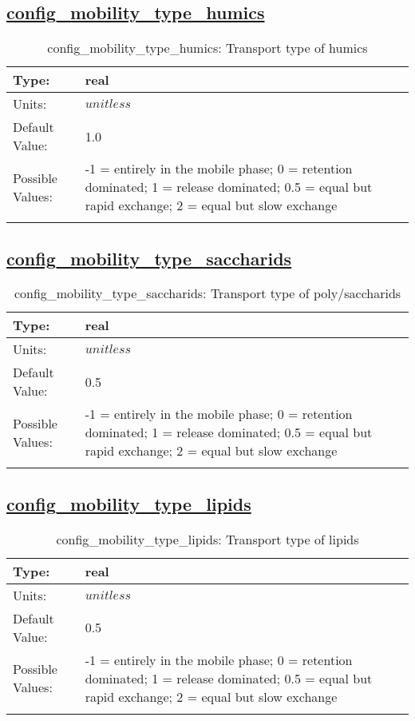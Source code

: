 \subsection[config\_mobility\_type\_humics]{\hyperref[sec:nm_tab_biogeochemistry]{config\_mobility\_type\_humics}}
\label{subsec:nm_sec_config_mobility_type_humics}
\begin{center}
\begin{longtable}{| p{2.0in} || p{4.0in} |}
    \hline
    Type: & real \\
    \hline
    Units: & $unitless$ \\
    \hline
    Default Value: & 1.0 \\
    \hline
    Possible Values: & -1 = entirely in the mobile phase; 0 = retention dominated;     1 = release dominated; 0.5 = equal but rapid exchange;     2 = equal but slow exchange \\
    \hline
    \caption{config\_mobility\_type\_humics: Transport type of humics}
\end{longtable}
\end{center}
\subsection[config\_mobility\_type\_saccharids]{\hyperref[sec:nm_tab_biogeochemistry]{config\_mobility\_type\_saccharids}}
\label{subsec:nm_sec_config_mobility_type_saccharids}
\begin{center}
\begin{longtable}{| p{2.0in} || p{4.0in} |}
    \hline
    Type: & real \\
    \hline
    Units: & $unitless$ \\
    \hline
    Default Value: & 0.5 \\
    \hline
    Possible Values: & -1 = entirely in the mobile phase; 0 = retention dominated;     1 = release dominated; 0.5 = equal but rapid exchange;     2 = equal but slow exchange \\
    \hline
    \caption{config\_mobility\_type\_saccharids: Transport type of poly/saccharids}
\end{longtable}
\end{center}
\subsection[config\_mobility\_type\_lipids]{\hyperref[sec:nm_tab_biogeochemistry]{config\_mobility\_type\_lipids}}
\label{subsec:nm_sec_config_mobility_type_lipids}
\begin{center}
\begin{longtable}{| p{2.0in} || p{4.0in} |}
    \hline
    Type: & real \\
    \hline
    Units: & $unitless$ \\
    \hline
    Default Value: & 0.5 \\
    \hline
    Possible Values: & -1 = entirely in the mobile phase; 0 = retention dominated;     1 = release dominated; 0.5 = equal but rapid exchange;     2 = equal but slow exchange \\
    \hline
    \caption{config\_mobility\_type\_lipids: Transport type of lipids}
\end{longtable}
\end{center}
